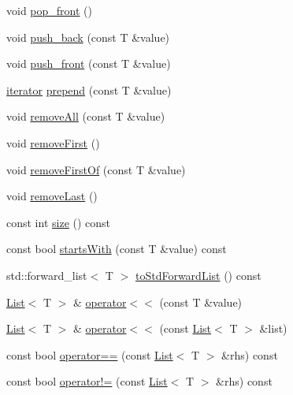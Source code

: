 \begin{DoxyCompactItemize}
\item 
void \hyperlink{classprism_1_1_list_ab8a836a10bc37479fbbc458299d68569}{pop\+\_\+front} ()
\item 
void \hyperlink{classprism_1_1_list_aabc7020d0f04bc29412d2ff2cb632958}{push\+\_\+back} (const T \&value)
\item 
void \hyperlink{classprism_1_1_list_a9af267cdacc311662e39630da33f4431}{push\+\_\+front} (const T \&value)
\item 
\hyperlink{classprism_1_1_list_a6cf00c98a428ed325fe9ccc60d7ef95a}{iterator} \hyperlink{classprism_1_1_list_a01773efbec8bef23c7a37edb9ea7a93f}{prepend} (const T \&value)
\item 
void \hyperlink{classprism_1_1_list_a85937bf298db8c1c8f8017fff492b374}{remove\+All} (const T \&value)
\item 
void \hyperlink{classprism_1_1_list_a3e19c548f9f8205bea45d394ddcb9ccb}{remove\+First} ()
\item 
void \hyperlink{classprism_1_1_list_a8ee7eadb17120e6fa267278d0d58c13f}{remove\+First\+Of} (const T \&value)
\item 
void \hyperlink{classprism_1_1_list_ab6b68a4de2134c159b8e35a2f4bb935d}{remove\+Last} ()
\item 
const int \hyperlink{classprism_1_1_list_a90855d0c971c394fabf612c02dce4d3a}{size} () const 
\item 
const bool \hyperlink{classprism_1_1_list_ac129dafdb80ae13cfc914dc0668e6b39}{starts\+With} (const T \&value) const 
\item 
std\+::forward\+\_\+list$<$ T $>$ \hyperlink{classprism_1_1_list_ab628c77e4598e1055a8b832367a31997}{to\+Std\+Forward\+List} () const 
\item 
\hyperlink{classprism_1_1_list}{List}$<$ T $>$ \& \hyperlink{classprism_1_1_list_a86dfdf909c7151a54d231d15315acca1}{operator$<$$<$} (const T \&value)
\item 
\hyperlink{classprism_1_1_list}{List}$<$ T $>$ \& \hyperlink{classprism_1_1_list_aed7d35e45035b24e4a684f0b1c228086}{operator$<$$<$} (const \hyperlink{classprism_1_1_list}{List}$<$ T $>$ \&list)
\item 
const bool \hyperlink{classprism_1_1_list_a4c14c11fdcb43c27a1035fccbe0f7b4d}{operator==} (const \hyperlink{classprism_1_1_list}{List}$<$ T $>$ \&rhs) const 
\item 
const bool \hyperlink{classprism_1_1_list_a026cc068bceff4e74fd991e3940b76d7}{operator!=} (const \hyperlink{classprism_1_1_list}{List}$<$ T $>$ \&rhs) const 
\item 

\end{DoxyCompactItemize}
